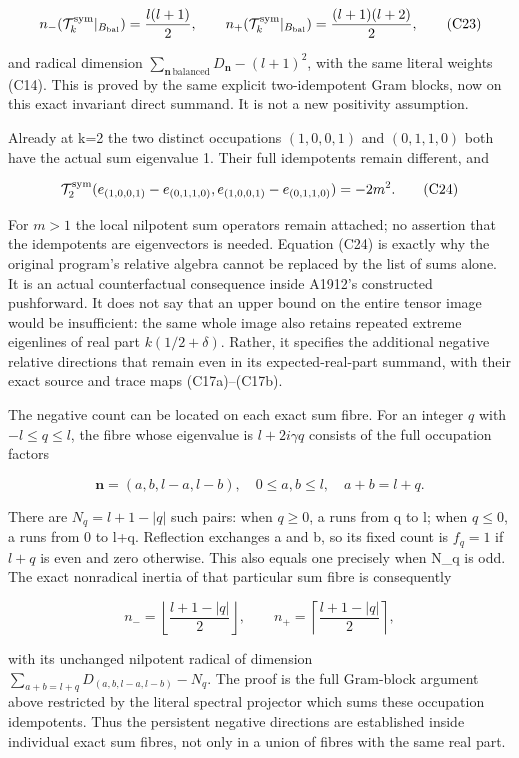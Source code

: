\[
n_-(\mathcal T_k^{\rm sym}|_{B_{\rm bal}})=\frac{l(l+1)}2,
\qquad
n_+(\mathcal T_k^{\rm sym}|_{B_{\rm bal}})=\frac{(l+1)(l+2)}2,
\tag{C23}
\]

and radical dimension \(\sum_{\boldsymbol n\,\mathrm{balanced}}D_{\boldsymbol n}-(l+1)^2\), with the same literal weights (C14). This is proved by the same explicit two-idempotent Gram blocks, now on this exact invariant direct summand. It is not a new positivity assumption.

Already at k=2 the two distinct occupations \((1,0,0,1)\) and \((0,1,1,0)\) both have the actual sum eigenvalue 1. Their full idempotents remain different, and

\[
\mathcal T_2^{\rm sym}
(e_{(1,0,0,1)}-e_{(0,1,1,0)},
 e_{(1,0,0,1)}-e_{(0,1,1,0)})=-2m^2.
\tag{C24}
\]

For \(m>1\) the local nilpotent sum operators remain attached; no assertion that the idempotents are eigenvectors is needed. Equation (C24) is exactly why the original program's relative algebra cannot be replaced by the list of sums alone. It is an actual counterfactual consequence inside A1912's constructed pushforward. It does not say that an upper bound on the entire tensor image would be insufficient: the same whole image also retains repeated extreme eigenlines of real part \(k(1/2+\delta)\). Rather, it specifies the additional negative relative directions that remain even in its expected-real-part summand, with their exact source and trace maps (C17a)--(C17b).

The negative count can be located on each exact sum fibre. For an integer \(q\) with \(-l\le q\le l\), the fibre whose eigenvalue is \(l+2i\gamma q\) consists of the full occupation factors

\[
\boldsymbol n=(a,b,l-a,l-b),\quad
0\le a,b\le l,\quad a+b=l+q.
\]

There are \(N_q=l+1-|q|\) such pairs: when \(q\ge0\), a runs from q to l; when \(q\le0\), a runs from 0 to l+q. Reflection exchanges a and b, so its fixed count is \(f_q=1\) if \(l+q\) is even and zero otherwise. This also equals one precisely when N\_q is odd. The exact nonradical inertia of that particular sum fibre is consequently

\[
n_- =\left\lfloor\frac{l+1-|q|}{2}\right\rfloor,
\qquad
n_+ =\left\lceil\frac{l+1-|q|}{2}\right\rceil,
\tag{C25}
\]

with its unchanged nilpotent radical of dimension \(\sum_{a+b=l+q}D_{(a,b,l-a,l-b)}-N_q\). The proof is the full Gram-block argument above restricted by the literal spectral projector which sums these occupation idempotents. Thus the persistent negative directions are established inside individual exact sum fibres, not only in a union of fibres with the same real part.
